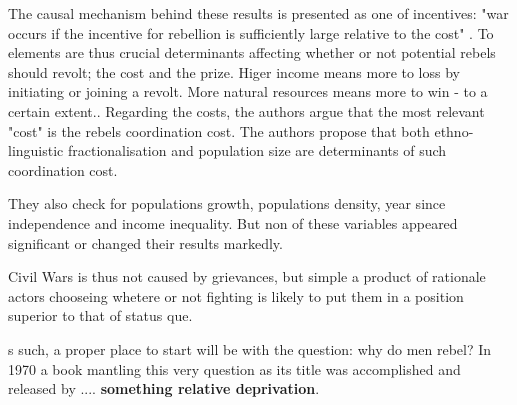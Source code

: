 The causal mechanism behind these results is presented as one of incentives: "war occurs if the incentive for rebellion is sufficiently large relative to the cost" \citep[563]{Collier_Hoeffler_1998}. To elements are thus crucial determinants affecting whether or not potential rebels should revolt; the cost and the prize. Higer income means more to loss by initiating or joining a revolt\citep[565]{Collier_Hoeffler_1998}. More natural resources means more to win - to a certain extent.\citep[566-567]{Collier_Hoeffler_1998}. Regarding the costs, the authors argue that the most relevant "cost" is the rebels coordination cost. The authors propose that both ethno-linguistic fractionalisation and population size are determinants of such coordination cost\citep[567]{Collier_Hoeffler_1998}.\par 

They also check for populations growth, populations density, year since independence and income inequality. But non of these variables appeared significant or changed their results markedly\citep[570]{Collier_Hoeffler_1998}.\par

Civil Wars is thus not caused by grievances, but simple a product of rationale actors chooseing whetere or not fighting is likely to put them in a position superior to that of status que.  





s such, a proper place to start will be with the question: why do men rebel? In 1970 a book mantling this very question as its title was accomplished and released by \cite{Gurr_1970}.... \textbf{something relative deprivation}.\par 




